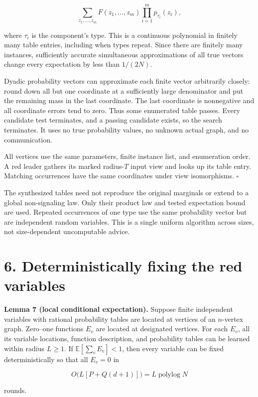 \documentclass[11pt,a4paper]{article}
\begin{document}
\[ \sum_{z_1,\ldots,z_m} F(z_1,\ldots,z_m)\prod_{i=1}^mp_{\tau_i}(z_i), \]

where \(\tau_i\) is the component's type.
This is a continuous polynomial in finitely many table entries, including when types repeat.
Since there are finitely many instances, sufficiently accurate simultaneous approximations of all true vectors change every expectation by less than \(1/(2N)\).

Dyadic probability vectors can approximate each finite vector arbitrarily closely: round down all but one coordinate at a sufficiently large denominator and put the remaining mass in the last coordinate.
The last coordinate is nonnegative and all coordinate errors tend to zero.
Thus some enumerated table passes.
Every candidate test terminates, and a passing candidate exists, so the search terminates.
It uses no true probability values, no unknown actual graph, and no communication.

All vertices use the same parameters, finite instance list, and enumeration order.
A red leader gathers its marked radius-\(T\) input view and looks up its table entry.
Matching occurrences have the same coordinates under view isomorphisms. \(\square\)

The synthesized tables need not reproduce the original marginals or extend to a global non-signaling law.
Only their product law and tested expectation bound are used.
Repeated occurrences of one type use the same probability vector but are independent random variables.
This is a single uniform algorithm across sizes, not size-dependent uncomputable advice.

\section{6. Deterministically fixing the red variables}\label{deterministically-fixing-the-red-variables}

\textbf{Lemma 7 (local conditional expectation).} Suppose finite independent variables with rational probability tables are located at vertices of an \(n\)-vertex graph.
Zero--one functions \(E_v\) are located at designated vertices.
For each \(E_v\), all its variable locations, function description, and probability tables can be learned within radius \(L\ge1\).
If \(\mathbb E[\sum_vE_v]<1\), then every variable can be fixed deterministically so that all \(E_v=0\) in

\[ O\bigl(L[P+Q(d+1)]\bigr)=L\operatorname{polylog}N \]

rounds.
\end{document}
